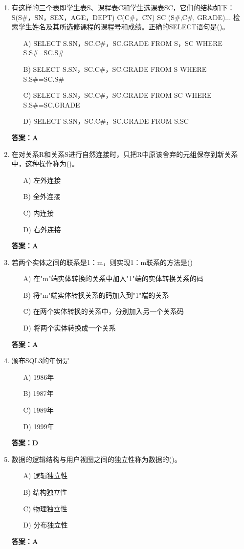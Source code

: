 \documentclass[a4paper,12pt]{article}
\begin{document}
\begin{enumerate}[label=\arabic*.]
\item 有这样的三个表即学生表S、课程表C和学生选课表SC，它们的结构如下：S(S\#，SN，SEX，AGE，DEPT) C(C\#，CN) SC (S\#,C\#, GRADE)... 检索学生姓名及其所选修课程的课程号和成绩。正确的SELECT语句是()。
\begin{itemize}
    \item[A)] SELECT S.SN，SC.C\#，SC.GRADE FROM S，SC WHERE S.S\#=SC.S\#
    \item[B)] SELECT S.SN，SC.C\#，SC.GRADE FROM S WHERE S.S\#=SC.S\#
    \item[C)] SELECT S.SN，SC.C\#，SC.GRADE FROM SC WHERE S.S\#=SC.GRADE
    \item[D)] SELECT S.SN，SC.C\#，SC.GRADE FROM S.SC
\end{itemize}
\textbf{答案：A}

\item 在对关系R和关系S进行自然连接时，只把R中原该舍弃的元组保存到新关系中，这种操作称为()。
\begin{itemize}
    \item[A)] 左外连接
    \item[B)] 全外连接
    \item[C)] 内连接
    \item[D)] 右外连接
\end{itemize}
\textbf{答案：A}

\item 若两个实体之间的联系是1：m，则实现1：m联系的方法是()
\begin{itemize}
    \item[A)] 在"m"端实体转换的关系中加入"1"端的实体转换关系的码
    \item[B)] 将"m"端实体转换关系的码加入到"1"端的关系
    \item[C)] 在两个实体转换的关系中，分别加入另一个关系码
    \item[D)] 将两个实体转换成一个关系
\end{itemize}
\textbf{答案：A}

\item 颁布SQL3的年份是
\begin{itemize}
    \item[A)] 1986年
    \item[B)] 1987年
    \item[C)] 1989年
    \item[D)] 1999年
\end{itemize}
\textbf{答案：D}

\item 数据的逻辑结构与用户视图之间的独立性称为数据的()。
\begin{itemize}
    \item[A)] 逻辑独立性
    \item[B)] 结构独立性
    \item[C)] 物理独立性
    \item[D)] 分布独立性
\end{itemize}
\textbf{答案：A}


\end{enumerate}
\end{document}

